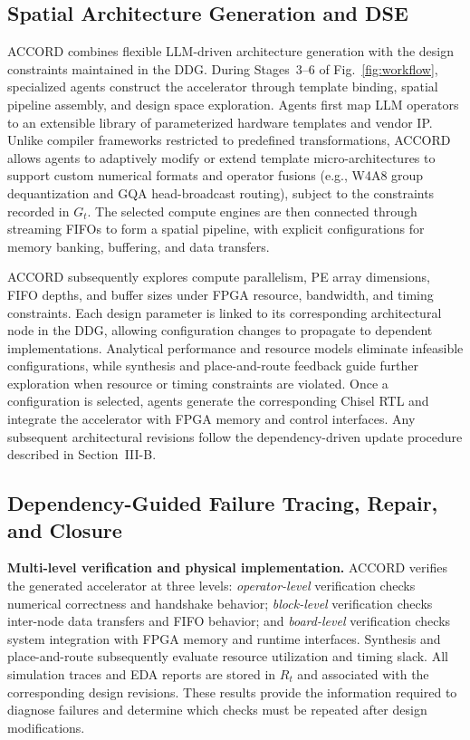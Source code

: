 \documentclass[9pt,conference]{IEEEtran}
\begin{document}
\subsection{Spatial Architecture Generation and DSE}
ACCORD combines flexible LLM-driven architecture generation with the design constraints maintained in the DDG. During Stages~3--6 of Fig.~\ref{fig:workflow}, specialized agents construct the accelerator through template binding, spatial pipeline assembly, and design space exploration. Agents first map LLM operators to an extensible library of parameterized hardware templates and vendor IP. Unlike compiler frameworks restricted to predefined transformations, ACCORD allows agents to adaptively modify or extend template micro-architectures to support custom numerical formats and operator fusions (e.g., W4A8 group dequantization and GQA head-broadcast routing), subject to the constraints recorded in $G_t$. The selected compute engines are then connected through streaming FIFOs to form a spatial pipeline, with explicit configurations for memory banking, buffering, and data transfers.

ACCORD subsequently explores compute parallelism, PE array dimensions, FIFO depths, and buffer sizes under FPGA resource, bandwidth, and timing constraints. Each design parameter is linked to its corresponding architectural node in the DDG, allowing configuration changes to propagate to dependent implementations. Analytical performance and resource models eliminate infeasible configurations, while synthesis and place-and-route feedback guide further exploration when resource or timing constraints are violated. Once a configuration is selected, agents generate the corresponding Chisel RTL and integrate the accelerator with FPGA memory and control interfaces. Any subsequent architectural revisions follow the dependency-driven update procedure described in Section~III-B.

\subsection{Dependency-Guided Failure Tracing, Repair, and Closure}
\textbf{Multi-level verification and physical implementation.}
ACCORD verifies the generated accelerator at three levels: \emph{operator-level} verification checks numerical correctness and handshake behavior; \emph{block-level} verification checks inter-node data transfers and FIFO behavior; and \emph{board-level} verification checks system integration with FPGA memory and runtime interfaces. Synthesis and place-and-route subsequently evaluate resource utilization and timing slack. All simulation traces and EDA reports are stored in $R_t$ and associated with the corresponding design revisions. These results provide the information required to diagnose failures and determine which checks must be repeated after design modifications.
\end{document}
